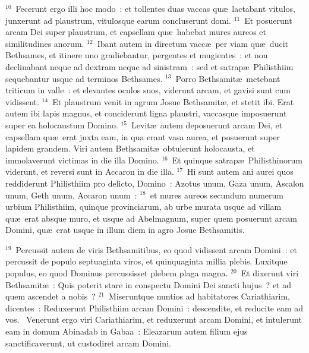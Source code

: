 ${}^{10}$~Fecerunt ergo illi hoc modo~: et tollentes duas vaccas qu\ae\ lactabant vitulos, junxerunt ad plaustrum, vitulosque earum concluserunt domi.
${}^{11}$~Et posuerunt arcam Dei super plaustrum, et capsellam qu\ae\ habebat mures aureos et similitudines anorum.
${}^{12}$~Ibant autem in directum vacc\ae\ per viam qu\ae\ ducit Bethsames, et itinere uno gradiebantur, pergentes et mugientes~: et non declinabant neque ad dextram neque ad sinistram~: sed et satrap\ae\ Philisthiim sequebantur usque ad terminos Bethsames.
${}^{13}$~Porro Bethsamit\ae\ metebant triticum in valle~: et elevantes oculos suos, viderunt arcam, et gavisi sunt cum vidissent.
${}^{14}$~Et plaustrum venit in agrum Josue Bethsamit\ae , et stetit ibi. Erat autem ibi lapis magnus, et conciderunt ligna plaustri, vaccasque imposuerunt super ea holocaustum Domino.
${}^{15}$~Levit\ae\ autem deposuerunt arcam Dei, et capsellam qu\ae\ erat juxta eam, in qua erant vasa aurea, et posuerunt super lapidem grandem. Viri autem Bethsamit\ae\ obtulerunt holocausta, et immolaverunt victimas in die illa Domino.
${}^{16}$~Et quinque satrap\ae\ Philisthinorum viderunt, et reversi sunt in Accaron in die illa.
${}^{17}$~Hi sunt autem ani aurei quos reddiderunt Philisthiim pro delicto, Domino~: Azotus unum, Gaza unum, Ascalon unum, Geth unum, Accaron unum~:
${}^{18}$~et mures aureos secundum numerum urbium Philisthiim, quinque provinciarum, ab urbe murata usque ad villam qu\ae\ erat absque muro, et usque ad Abelmagnum, super quem posuerunt arcam Domini, qu\ae\ erat usque in illum diem in agro Josue Bethsamitis.


${}^{19}$~Percussit autem de viris Bethsamitibus, eo quod vidissent arcam Domini~: et percussit de populo septuaginta viros, et quinquaginta millia plebis. Luxitque populus, eo quod Dominus percussisset plebem plaga magna.
${}^{20}$~Et dixerunt viri Bethsamit\ae~: Quis poterit stare in conspectu Domini Dei sancti hujus~? et ad quem ascendet a nobis~?
${}^{21}$~Miseruntque nuntios ad habitatores Cariathiarim, dicentes~: Reduxerunt Philisthiim arcam Domini~: descendite, et reducite eam ad vos.
~Venerunt ergo viri Cariathiarim, et reduxerunt arcam Domini, et intulerunt eam in domum Abinadab in Gabaa~: Eleazarum autem filium ejus sanctificaverunt, ut custodiret arcam Domini.


